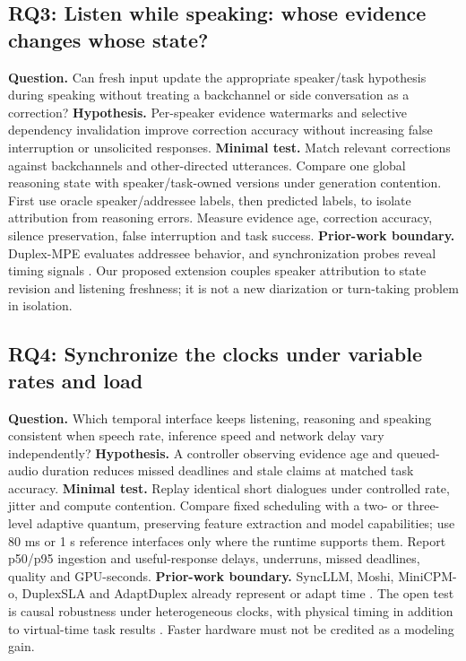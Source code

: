 \documentclass{article}
\newcommand{\researchquestion}[2]{\subsection{#1: #2}}
\begin{document}
\researchquestion{RQ3}{Listen while speaking: whose evidence changes whose state?}
\textbf{Question.} Can fresh input update the appropriate speaker/task hypothesis during speaking without treating a backchannel or side conversation as a correction? \textbf{Hypothesis.} Per-speaker evidence watermarks and selective dependency invalidation improve correction accuracy without increasing false interruption or unsolicited responses. \textbf{Minimal test.} Match relevant corrections against backchannels and other-directed utterances. Compare one global reasoning state with speaker/task-owned versions under generation contention. First use oracle speaker/addressee labels, then predicted labels, to isolate attribution from reasoning errors. Measure evidence age, correction accuracy, silence preservation, false interruption and task success. \textbf{Prior-work boundary.} Duplex-MPE evaluates addressee behavior, and synchronization probes reveal timing signals \citep{mpe,synchrony}. Our proposed extension couples speaker attribution to state revision and listening freshness; it is not a new diarization or turn-taking problem in isolation.

\researchquestion{RQ4}{Synchronize the clocks under variable rates and load}
\textbf{Question.} Which temporal interface keeps listening, reasoning and speaking consistent when speech rate, inference speed and network delay vary independently? \textbf{Hypothesis.} A controller observing evidence age and queued-audio duration reduces missed deadlines and stale claims at matched task accuracy. \textbf{Minimal test.} Replay identical short dialogues under controlled rate, jitter and compute contention. Compare fixed scheduling with a two- or three-level adaptive quantum, preserving feature extraction and model capabilities; use 80 ms or 1 s reference interfaces only where the runtime supports them. Report p50/p95 ingestion and useful-response delays, underruns, missed deadlines, quality and GPU-seconds. \textbf{Prior-work boundary.} SyncLLM, Moshi, MiniCPM-o, DuplexSLA and AdaptDuplex already represent or adapt time \citep{syncllm,moshi,minicpm,duplexsla,adapt}. The open test is causal robustness under heterogeneous clocks, with physical timing in addition to virtual-time task results \citep{tauvoice}. Faster hardware must not be credited as a modeling gain.
\end{document}

